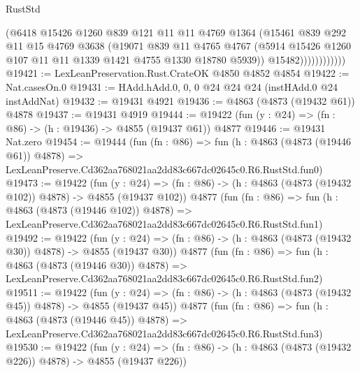 \begin{lexlean}{RustStd}
\begin{coremodule}
                        (@6418
                          @15426
                          @1260
                          @839
                          @121
                          @11
                          @11
                          @4769
                          @1364
                          (@15461
                            @839
                            @292
                            @11
                            @15
                            @4769
                            @3638
                            (@19071
                              @839
                              @11
                              @4765
                              @4767
                              (@5914
                                @15426
                                @1260
                                @107
                                @11
                                @11
                                @1339
                                @1421
                                @4755
                                @1330
                                @18780
                                @5939))
                            @15482))))))))))))
@19421 := LexLeanPreservation.Rust.CrateOK @4850 @4852 @4854
@19422 := Nat.casesOn.{0}
@19431 := HAdd.hAdd.{0, 0, 0} @24 @24 @24 (instHAdd.{0} @24 instAddNat)
@19432 := @19431 @4921
@19436 := @4863 (@4873 (@19432 @61)) @4878
@19437 := @19431 @4919
@19444 := @19422 (fun (y : @24) => (fn : @86) -> (h : @19436) -> @4855 (@19437 @61)) @4877
@19446 := @19431 Nat.zero
@19454 := @19444
    (fun (fn : @86) =>
    fun (h : @4863 (@4873 (@19446 @61)) @4878) =>
    LexLeanPreserve.Cd362aa768021aa2dd83c667dc02645c0.R6.RustStd.fun0)
@19473 := @19422
    (fun (y : @24) => (fn : @86) -> (h : @4863 (@4873 (@19432 @102)) @4878) -> @4855 (@19437 @102))
    @4877
    (fun (fn : @86) =>
    fun (h : @4863 (@4873 (@19446 @102)) @4878) =>
    LexLeanPreserve.Cd362aa768021aa2dd83c667dc02645c0.R6.RustStd.fun1)
@19492 := @19422
    (fun (y : @24) => (fn : @86) -> (h : @4863 (@4873 (@19432 @30)) @4878) -> @4855 (@19437 @30))
    @4877
    (fun (fn : @86) =>
    fun (h : @4863 (@4873 (@19446 @30)) @4878) =>
    LexLeanPreserve.Cd362aa768021aa2dd83c667dc02645c0.R6.RustStd.fun2)
@19511 := @19422
    (fun (y : @24) => (fn : @86) -> (h : @4863 (@4873 (@19432 @45)) @4878) -> @4855 (@19437 @45))
    @4877
    (fun (fn : @86) =>
    fun (h : @4863 (@4873 (@19446 @45)) @4878) =>
    LexLeanPreserve.Cd362aa768021aa2dd83c667dc02645c0.R6.RustStd.fun3)
@19530 := @19422
    (fun (y : @24) => (fn : @86) -> (h : @4863 (@4873 (@19432 @226)) @4878) -> @4855 (@19437 @226))

\end{coremodule}
\end{lexlean}

